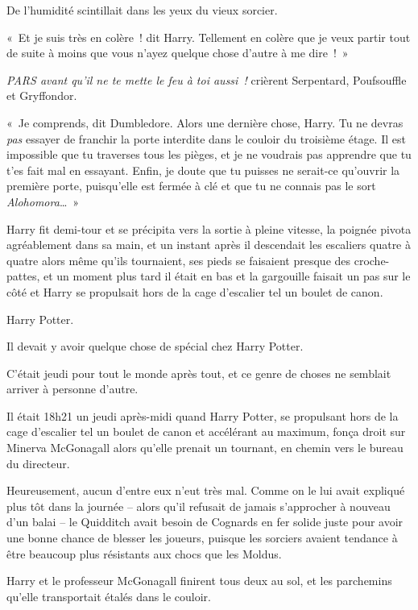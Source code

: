 De l'humidité scintillait dans les yeux du vieux sorcier.

«~Et je suis très en colère~! dit Harry. Tellement en colère que je veux partir tout de suite à moins que vous n'ayez quelque chose d'autre à me dire~!~»

\emph{PARS avant qu'il ne te mette le feu à toi aussi~!} crièrent Serpentard, Poufsouffle et Gryffondor.

«~Je comprends, dit Dumbledore. Alors une dernière chose, Harry. Tu ne devras \emph{pas} essayer de franchir la porte interdite dans le couloir du troisième étage. Il est impossible que tu traverses tous les pièges, et je ne voudrais pas apprendre que tu t'es fait mal en essayant. Enfin, je doute que tu puisses ne serait-ce qu'ouvrir la première porte, puisqu'elle est fermée à clé et que tu ne connais pas le sort \emph{Alohomora}…~»

Harry fit demi-tour et se précipita vers la sortie à pleine vitesse, la poignée pivota agréablement dans sa main, et un instant après il descendait les escaliers quatre à quatre alors même qu'ils tournaient, ses pieds se faisaient presque des croche-pattes, et un moment plus tard il était en bas et la gargouille faisait un pas sur le côté et Harry se propulsait hors de la cage d'escalier tel un boulet de canon.

\later

Harry Potter.

Il devait y avoir quelque chose de spécial chez Harry Potter.

C'était jeudi pour tout le monde après tout, et ce genre de choses ne semblait arriver à personne d'autre.

Il était 18h21 un jeudi après-midi quand Harry Potter, se propulsant hors de la cage d'escalier tel un boulet de canon et accélérant au maximum, fonça droit sur Minerva McGonagall alors qu'elle prenait un tournant, en chemin vers le bureau du directeur.

Heureusement, aucun d'entre eux n'eut très mal. Comme on le lui avait expliqué plus tôt dans la journée -- alors qu'il refusait de jamais s'approcher à nouveau d'un balai -- le Quidditch avait besoin de Cognards en fer solide juste pour avoir une bonne chance de blesser les joueurs, puisque les sorciers avaient tendance à être beaucoup plus résistants aux chocs que les Moldus.

Harry et le professeur McGonagall finirent tous deux au sol, et les parchemins qu'elle transportait étalés dans le couloir.

